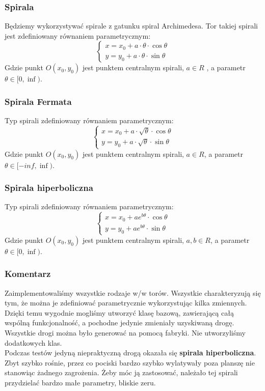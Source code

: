 	\subsubsection{Spirala}
		\indent \indent Będziemy wykorzystywać spirale z gatunku spiral Archimedesa. Tor takiej spirali jest zdefiniowany równaniem parametrycznym:
		$$
		\begin{cases}
		x=x_0+a\cdot \theta \cdot \cos{\theta}\\
		y=y_0+a\cdot \theta \cdot \sin{\theta}
		\end{cases}
		$$
		Gdzie punkt $ O(x_0, y_0) $ jest punktem centralnym spirali, $ a \in R $ , a parametr $ \theta \in [0, \inf ) $.
	\subsubsection{Spirala Fermata}
		\indent \indent Typ spirali zdefiniowany równaniem parametrycznym:
		$$
		\begin{cases}
		x=x_0+a\cdot \sqrt{\theta} \cdot \cos{\theta}\\
		y=y_0+a\cdot \sqrt{\theta} \cdot \sin{\theta}
		\end{cases}
		$$
		Gdzie punkt $ O(x_0, y_0) $ jest punktem centralnym spirali, $ a \in R $, a parametr $ \theta \in [-inf, \inf ) $.
	\subsubsection{Spirala hiperboliczna}
		\indent \indent Typ spirali zdefiniowany równaniem parametrycznym:
		$$
		\begin{cases}
		x=x_0+ae^{b\theta} \cdot \cos{\theta}\\
		y=y_0+ae^{b\theta} \cdot \sin{\theta}
		\end{cases}
		$$
		Gdzie punkt $ O(x_0, y_0) $ jest punktem centralnym spirali, $ a,b \in R $, a parametr $ \theta \in [0, \inf ) $.
	\subsubsection{{\large Komentarz}}
		\indent \indent Zaimplementowaliśmy wszystkie rodzaje w/w torów. Wszystkie charakteryzują się tym, że można je zdefiniować parametrycznie wykorzystując kilka zmiennych. Dzięki temu wygodnie mogliśmy utworzyć klasę bazową, zawierającą całą wspólną funkcjonalność, a pochodne jedynie zmieniały uzyskiwaną drogę. Wszystkie drogi można było generować na pomocą fabryki. Nie utworzyliśmy dodatkowych klas.\\
		\indent Podczas testów jedyną niepraktyczną drogą okazała się \textbf{spirala hiperboliczna}. Zbyt szybko rośnie, przez co pociski bardzo szybko wylatywały poza planszę nie stanowiąc żadnego zagrożenia. Żeby móc ją zastosować, należało tej spirali przydzielać bardzo małe parametry, bliskie zeru.


